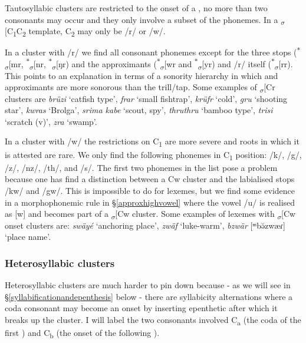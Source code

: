 Tautosyllabic clusters are restricted to the onset of a , no more than two consonants may occur and they only involve a subset of the phonemes. In a \textsubscript{$\sigma$}[C\textsubscript{1}C\textsubscript{2} template, C\textsubscript{2} may only be /r/ or /w/.%

In a cluster with /r/ we find all consonant phonemes except for the three  stops (\textsuperscript{$\ast$}\textsubscript{$\sigma$}[mr, \textsuperscript{$\ast$}\textsubscript{$\sigma$}[nr, \textsuperscript{$\ast$}\textsubscript{$\sigma$}[ŋr) and the approximants (\textsuperscript{$\ast$}\textsubscript{$\sigma$}[wr and \textsuperscript{$\ast$}\textsubscript{$\sigma$}[yr) and /r/ itself (\textsuperscript{$\ast$}\textsubscript{$\sigma$}[rr). This points to an explanation in terms of a sonority hierarchy in which  and approximants are more sonorous than the trill/tap. Some examples of \textsubscript{$\sigma$}[Cr clusters are \emph{brüzi} `catfish type', \emph{frar} `small fishtrap', \emph{krüfr} `cold', \emph{gru} `shooting star', \emph{kwras} `Brolga', \emph{srima kabe} `scout, spy', \emph{thruthru} `bamboo type', \emph{trisi} `scratch (v)', \emph{zra} `swamp'.%

In a cluster with /w/ the restrictions on C\textsubscript{1} are more severe and roots in which it is attested are rare. We only find the following phonemes in C\textsubscript{1} position: /k/, /g/, /z/, /nz/, /th/, and /s/. The first two phonemes in the list pose a problem because one has find a distinction between a Cw cluster and the labialised  stops /kw/ and /gw/. This is impossible to do for lexemes, but we find some evidence in a morphophonemic rule in \S{}\ref{approxhighvowel} where the vowel /u/ is realised as [w] and becomes part of a \textsubscript{$\sigma$}[Cw cluster. Some examples of lexemes with \textsubscript{$\sigma$}[Cw onset clusters are: \emph{swäyé} `anchoring place', \emph{zwäf} `luke-warm', \emph{bzwär} [ᵐbə̆zwæɾ] `place name'.

\subsubsection{Heterosyllabic clusters} \label{heterosyllabiccc}

Heterosyllabic clusters are much harder to pin down because - as we will see in \S{}\ref{syllabificationandepenthesis} below - there are syllabicity alternations where a coda consonant may become an onset by inserting epenthetic  after which it breaks up the cluster. I will label the two consonants involved C\textsubscript{a} (the coda of the first ) and C\textsubscript{b} (the onset of the following ).%

